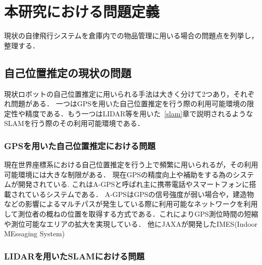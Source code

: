 \section{本研究における問題定義}
現状の自律飛行システムを倉庫内での物品管理に用いる場合の問題点を列挙し，整理する．

\subsection{自己位置推定の現状の問題}
現状ロボットの自己位置推定に用いられる手法は大きく分けて2つあり，それぞれ問題がある．
一つはGPSを用いた自己位置推定を行う際の利用可能環境の限定性や精度である．もう一つはLIDAR等を用いた~\ref{slam}章で説明されるようなSLAMを行う際のその利用可能環境である．

\subsubsection{GPSを用いた自己位置推定における問題}
現在世界座標系における自己位置推定を行う上で頻繁に用いられるが，その利用可能環境には大きな制限がある．
現在GPSの精度向上や補助をする為のシステムが開発されている.
これはA-GPS\cite{agps}と呼ばれ主に携帯電話やスマートフォンに搭載されているシステムである．
A-GPSはGPSの信号強度が弱い場合や，建造物などの影響によるマルチパスが発生している際に利用可能なネットワークを利用して測位者の概ねの位置を取得する方式である．これによりGPS測位時間の短縮や測位可能なエリアの拡大を実現している．
他にJAXAが開発したIMES(Indoor MEssaging System)\cite{imes}


\subsubsection{LIDARを用いたSLAMにおける問題}

